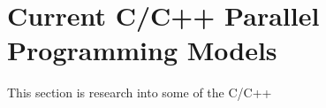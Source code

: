 \section{Current C/C++ Parallel Programming Models}

This section is research into some of the C/C++ 
